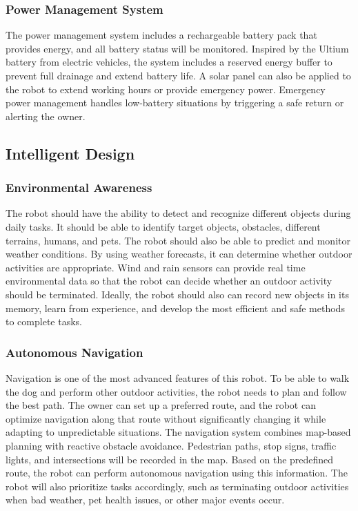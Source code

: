 \documentclass[conference,letterpaper]{IEEEtran}
\begin{document}
\subsubsection{Power Management System}

The power management system includes a rechargeable battery pack that provides energy, and all battery status will be monitored. Inspired by the Ultium battery from electric vehicles, the system includes a reserved energy buffer to prevent full drainage and extend battery life. A solar panel can also be applied to the robot to extend working hours or provide emergency power. Emergency power management handles low-battery situations by triggering a safe return or alerting the owner.

\subsection{Intelligent Design}

\subsubsection{Environmental Awareness}

The robot should have the ability to detect and recognize different objects during daily tasks. It should be able to identify target objects, obstacles, different terrains, humans, and pets. The robot should also be able to predict and monitor weather conditions. By using weather forecasts, it can determine whether outdoor activities are appropriate. Wind and rain sensors can provide real time environmental data so that the robot can decide whether an outdoor activity should be terminated. Ideally, the robot should also can record new objects in its memory, learn from experience, and develop the most efficient and safe methods to complete tasks.

\subsubsection{Autonomous Navigation}

Navigation is one of the most advanced features of this robot. To be able to walk the dog and perform other outdoor activities, the robot needs to plan and follow the best path. The owner can set up a preferred route, and the robot can optimize navigation along that route without significantly changing it while adapting to unpredictable situations. The navigation system combines map-based planning with reactive obstacle avoidance. Pedestrian paths, stop signs, traffic lights, and intersections will be recorded in the map. Based on the predefined route, the robot can perform autonomous navigation using this information. The robot will also prioritize tasks accordingly, such as terminating outdoor activities when bad weather, pet health issues, or other major events occur.
\end{document}
